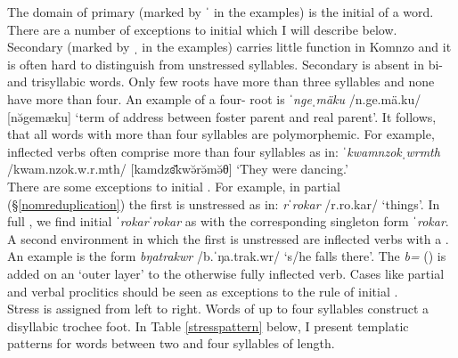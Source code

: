 The domain of primary  (marked by ˈ in the examples) is the initial  of a word. There are a number of exceptions to initial  which I will describe below. Secondary  (marked by ˌ in the examples) carries little function in Komnzo and it is often hard to distinguish from unstressed syllables. Secondary  is absent in bi- and trisyllabic words. Only few roots have more than three syllables and none have more than four. An example of a four- root is \emph{ˈngeˌmäku} /n.ge.mä.ku/ [nə̆gemæku] `term of address between foster parent and real parent'. It follows, that all words with more than four syllables are polymorphemic. For example, inflected verbs often comprise more than four syllables as in: \emph{ˈkwamnzokˌwrmth} /kwam.nzok.w.r.mth/ [kamdzɞ̆kwə̆rə̆mə̆θ] `They were dancing.'\\

There are some exceptions to initial . For example, in partial  (\S{}\ref{nomreduplication}) the first  is unstressed as in: \emph{rˈrokar} /r.ro.kar/ `things'. In full , we find initial  \emph{ˈrokarˈrokar} as with the corresponding singleton form \emph{ˈrokar}. A second environment in which the first  is unstressed are inflected verbs with a . An example is the form \emph{bŋatrakwr} /b.ˈŋa.trak.wr/ `s/he falls there'. The  \emph{b=} (\Med{}) is added on an `outer layer' to the otherwise fully inflected verb. Cases like partial  and verbal proclitics should be seen as exceptions to the rule of initial .\\

Stress is assigned from left to right. Words of up to four syllables construct a disyllabic trochee foot. In Table \ref{stresspattern} below, I present templatic  patterns for words between two and four syllables of length.

